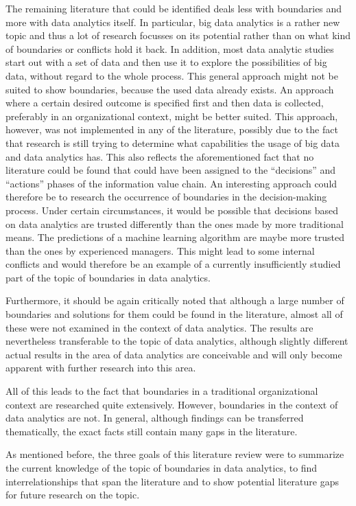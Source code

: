 The remaining literature that could be identified deals less with boundaries and more with data analytics itself. In particular, big data analytics is a rather new topic and thus a lot of research focusses on its potential rather than on what kind of boundaries or conflicts hold it back. In addition, most data analytic studies start out with a set of data and then use it to explore the possibilities of big data, without regard to the whole process. This general approach might not be suited to show boundaries, because the used data already exists. An approach where a certain desired outcome is specified first and then data is collected, preferably in an organizational context, might be better suited. This approach, however, was not implemented in any of the literature, possibly due to the fact that research is still trying to determine what capabilities the usage of big data and data analytics has. This also reflects the aforementioned fact that no literature could be found that could have been assigned to the \enquote{decisions} and \enquote{actions} phases of the information value chain. An interesting approach could therefore be to research the occurrence of boundaries in the decision-making process. Under certain circumstances, it would be possible that decisions based on data analytics are trusted differently than the ones made by more traditional means. The predictions of a machine learning algorithm are maybe more trusted than the ones by experienced managers. This might lead to some internal conflicts and would therefore be an example of a currently insufficiently studied part of the topic of boundaries in data analytics. 

Furthermore, it should be again critically noted that although a large number of boundaries and solutions for them could be found in the literature, almost all of these were not examined in the context of data analytics. The results are nevertheless transferable to the topic of data analytics, although slightly different actual results in the area of data analytics are conceivable and will only become apparent with further research into this area.

All of this leads to the fact that boundaries in a traditional organizational context are researched quite extensively. However, boundaries in the context of data analytics are not. In general, although findings can be transferred thematically, the exact facts still contain many gaps in the literature. 

As mentioned before, the three goals of this literature review were to summarize the current knowledge of the topic of boundaries in data analytics, to find interrelationships that span the literature and to show potential literature gaps for future research on the topic.

